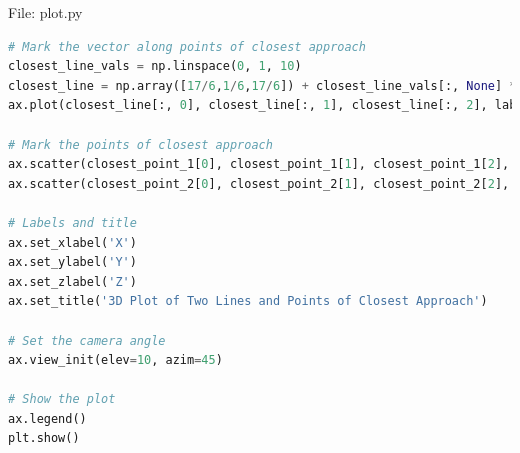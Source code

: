 \documentclass{beamer}
\numberwithin{equation}{section}
\theoremstyle{remark}
\begin{document}
\begin{frame}[fragile]{File: plot.py}
\begin{lstlisting}[language=Python]
# Mark the vector along points of closest approach
closest_line_vals = np.linspace(0, 1, 10)
closest_line = np.array([17/6,1/6,17/6]) + closest_line_vals[:, None] * np.array([3/2,0,-3/2])
ax.plot(closest_line[:, 0], closest_line[:, 1], closest_line[:, 2], label='Line of closest approach', color='green')

# Mark the points of closest approach
ax.scatter(closest_point_1[0], closest_point_1[1], closest_point_1[2], color='purple', s=10, label='Closest Point on Line 1')
ax.scatter(closest_point_2[0], closest_point_2[1], closest_point_2[2], color='orange', s=10, label='Closest Point on Line 2')

# Labels and title
ax.set_xlabel('X')
ax.set_ylabel('Y')
ax.set_zlabel('Z')
ax.set_title('3D Plot of Two Lines and Points of Closest Approach')

# Set the camera angle
ax.view_init(elev=10, azim=45)

# Show the plot
ax.legend()
plt.show()
\end{lstlisting}
\end{frame}
\end{document}
